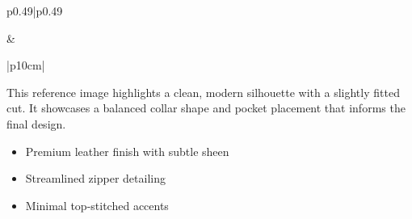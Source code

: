 \documentclass[landscape]{article}
\begin{document}
\begin{tabular}{p{0.49\textwidth}|p{0.49\textwidth}}
\begin{center}
\end{center}
&
\begin{center}
\begin{tabular}{|p{10cm}|}
\hline
{} \\
\hline
\begin{minipage}[t]{\linewidth}
\vspace{0.3cm}
This reference image highlights a clean, modern silhouette with a slightly fitted cut. It showcases a balanced collar shape and pocket placement that informs the final design. 
\begin{itemize}[leftmargin=*, label={\textcolor{accentgold}{}}]
  \item Premium leather finish with subtle sheen
  \item Streamlined zipper detailing
  \item Minimal top-stitched accents
\end{itemize}
\vspace{0.3cm}
\end{minipage} \\
\hline
\end{tabular}
\end{center}
\end{tabular}
\end{document}
